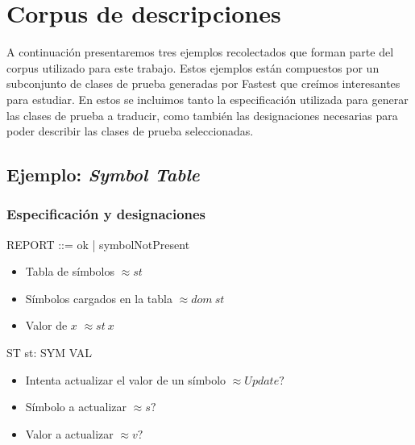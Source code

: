 \chapter{Corpus de descripciones}
\label{ape:corpus}

A continuación presentaremos tres ejemplos recolectados que forman parte del corpus utilizado para este trabajo. Estos ejemplos están compuestos por un subconjunto de clases de prueba generadas por Fastest que creímos interesantes para estudiar. En estos se incluimos tanto la especificación utilizada para generar las clases de prueba a traducir, como también las designaciones necesarias para poder describir las clases de prueba seleccionadas.

\section*{Ejemplo: \textit{Symbol Table}}

\subsection*{Especificación y designaciones}

\begin{zed}
 \also
REPORT ::= ok | symbolNotPresent
\end{zed}

\begin{itemize}
  \item Tabla de símbolos $\approx st$ \\
  \item Símbolos cargados en la tabla $\approx dom~st$ \\
  \item Valor de $x$ $\approx st~x$ \\
\end{itemize}

\begin{schema}{ST}
st: SYM \pfun VAL
\end{schema}

\begin{itemize}
  \item Intenta actualizar el valor de un símbolo $\approx Update?$ \\
  \item Símbolo a actualizar $\approx s?$ \\
  \item Valor a actualizar  $\approx v?$ \\
\end{itemize}

